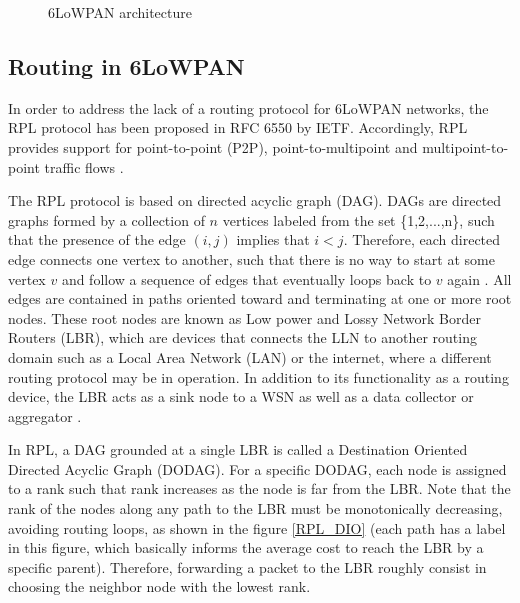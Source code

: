 \documentclass[final,authoryear,3p,twocolumn]{elsarticle}
\begin{document}
\begin{figure}
\centering
{}
\caption{6LoWPAN architecture}
\label{stack_6lowpan}
\end{figure}

\subsection{Routing in 6LoWPAN}
In order to address the lack of a routing protocol for 6LoWPAN networks, the RPL protocol has been proposed in RFC 6550 by IETF. Accordingly, RPL provides support for point-to-point (P2P), point-to-multipoint and multipoint-to-point traffic flows \citep{RFC6550}.

The RPL protocol is based on directed acyclic graph (DAG). DAGs are directed graphs formed by a collection of $n$ vertices labeled from the set \{1,2,...,n\}, such that the presence of the edge $(i,j)$ implies that $i < j$. Therefore, each directed edge connects one vertex to another, such that there is no way to start at some vertex $v$ and follow a sequence of edges that eventually loops back to $v$ again \citep{DAGS_1992}. All edges are contained in paths oriented toward and terminating at one or more root nodes. These root nodes are known as Low power and Lossy Network Border Routers (LBR), which are devices that connects the LLN to another routing domain such as a Local Area Network (LAN) or the internet, where a different routing protocol may be in operation. In addition to its functionality as a routing device, the LBR acts as a sink node to a WSN as well as a data collector or aggregator \citep{RFC7102}.

In RPL, a DAG grounded at a single LBR is called a Destination Oriented Directed Acyclic Graph (DODAG). For a specific DODAG, each node is assigned to a rank such that rank increases as the node is far from the LBR. Note that the rank of the nodes along any path to the LBR must be monotonically decreasing, avoiding routing loops, as shown in the figure \ref{RPL_DIO} (each path has a label in this figure, which basically informs the average cost to reach the LBR by a specific parent). Therefore, forwarding a packet to the LBR roughly consist in choosing the neighbor node with the lowest rank.
\end{document}
